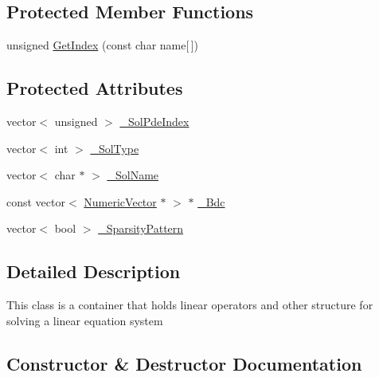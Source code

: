 \subsection*{Protected Member Functions}
\begin{DoxyCompactItemize}
\item 
unsigned \mbox{\hyperlink{classfemus_1_1_linear_equation_ae6f9872dad722bd16c70bc054c3dc618}{Get\+Index}} (const char name\mbox{[}$\,$\mbox{]})
\end{DoxyCompactItemize}
\subsection*{Protected Attributes}
\begin{DoxyCompactItemize}
\item 
vector$<$ unsigned $>$ \mbox{\hyperlink{classfemus_1_1_linear_equation_a8b868f08fce043a674a7dd36019142df}{\+\_\+\+Sol\+Pde\+Index}}
\item 
vector$<$ int $>$ \mbox{\hyperlink{classfemus_1_1_linear_equation_af827ced9cbb5f41c6c47635fcc4618d8}{\+\_\+\+Sol\+Type}}
\item 
vector$<$ char $\ast$ $>$ \mbox{\hyperlink{classfemus_1_1_linear_equation_afde1b3ccff18a62d064fc364a8965ac5}{\+\_\+\+Sol\+Name}}
\item 
const vector$<$ \mbox{\hyperlink{classfemus_1_1_numeric_vector}{Numeric\+Vector}} $\ast$ $>$ $\ast$ \mbox{\hyperlink{classfemus_1_1_linear_equation_a058468723c36718e5ff8ba6d5a9181d9}{\+\_\+\+Bdc}}
\item 
vector$<$ bool $>$ \mbox{\hyperlink{classfemus_1_1_linear_equation_a07c1c85eb73b070ac59a85bda3388fca}{\+\_\+\+Sparsity\+Pattern}}
\end{DoxyCompactItemize}


\subsection{Detailed Description}
This class is a container that holds linear operators and other structure for solving a linear equation system 

\subsection{Constructor \& Destructor Documentation}
\mbox{\label{classfemus_1_1_linear_equation_ac82d0ae000e0921cb2ba01ff93dcef45}} 
